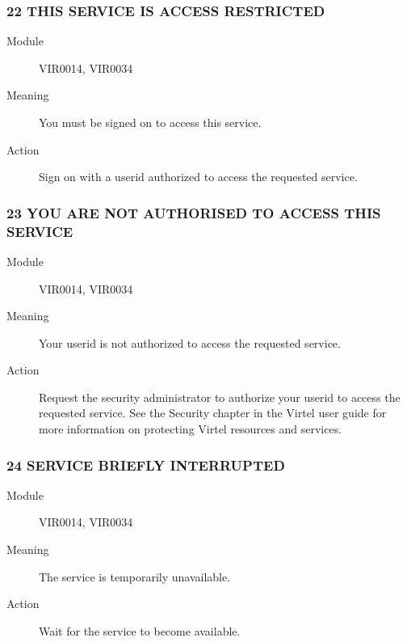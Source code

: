 \documentclass[letterpaper,10pt,english]{sphinxmanual}
\begin{document}
\subsubsection{22 THIS SERVICE IS ACCESS RESTRICTED}
\label{\detokenize{messages:this-service-is-access-restricted}}\begin{description}
\item[{Module}] \leavevmode
VIR0014, VIR0034

\item[{Meaning}] \leavevmode
You must be signed on to access this service.

\item[{Action}] \leavevmode
Sign on with a userid authorized to access the requested service.

\end{description}


\subsubsection{23 YOU ARE NOT AUTHORISED TO ACCESS THIS SERVICE}
\label{\detokenize{messages:you-are-not-authorised-to-access-this-service}}\begin{description}
\item[{Module}] \leavevmode
VIR0014, VIR0034

\item[{Meaning}] \leavevmode
Your userid is not authorized to access the requested service.

\item[{Action}] \leavevmode
Request the security administrator to authorize your userid to access the requested service. See the Security chapter in the Virtel user guide for more information on protecting Virtel resources and services.

\end{description}


\subsubsection{24 SERVICE BRIEFLY INTERRUPTED}
\label{\detokenize{messages:service-briefly-interrupted}}\begin{description}
\item[{Module}] \leavevmode
VIR0014, VIR0034

\item[{Meaning}] \leavevmode
The service is temporarily unavailable.

\item[{Action}] \leavevmode
Wait for the service to become available.

\end{description}
\end{document}
